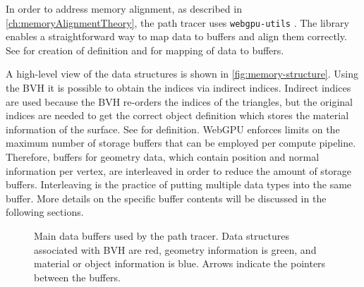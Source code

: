 In order to address memory alignment, as described in \autoref{ch:memoryAlignmentTheory}, the path tracer uses \texttt{webgpu-utils} \cite{webgpuUtilsLib}. The library enables a straightforward way to map data to buffers and align them correctly. See  for creation of definition and  for mapping of data to buffers.

A high-level view of the data structures is shown in \autoref{fig:memory-structure}. Using the \gls{BVH} it is possible to obtain the indices via indirect indices. Indirect indices are used because the \gls{BVH} re-orders the indices of the triangles, but the original indices are needed to get the correct object definition which stores the material information of the surface. See  for definition. \gls{WebGPU} enforces limits on the maximum number of storage buffers that can be employed per compute pipeline. Therefore, buffers for geometry data, which contain position and normal information per vertex, are interleaved in order to reduce the amount of storage buffers. Interleaving is the practice of putting multiple data types into the same buffer. More details on the specific buffer contents will be discussed in the following sections.

\begin{figure}[H]
    \centering
    \caption{Main data buffers used by the path tracer. Data structures associated with \gls{BVH} are red, geometry information is green, and material or object information is blue. Arrows indicate the pointers between the buffers.}
    \label{fig:memory-structure}
  \end{figure}

